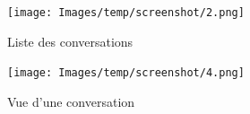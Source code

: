 \documentclass{article}
\begin{document}
	\begin{figure}[H]
  		\begin{center}
  			\texttt{[image: Images/temp/screenshot/2.png]}
  			\caption{Liste des conversations}
  			\label{fig:animals}
		\end{center}
	\end{figure}


\begin{figure}[H]
  		\begin{center}
  			\texttt{[image: Images/temp/screenshot/4.png]}
  			\caption{Vue d'une conversation}
  			\label{fig:animals}
		\end{center}
	\end{figure}
\end{document}
